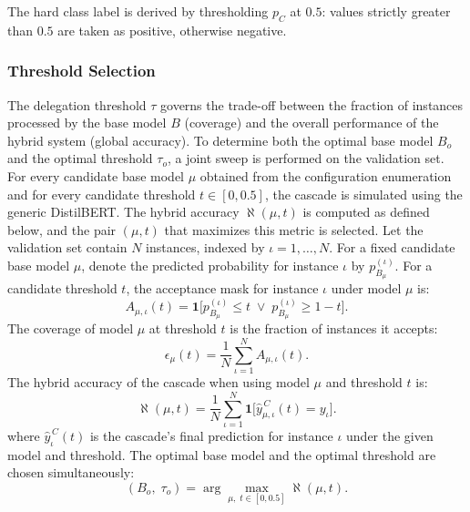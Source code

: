 \documentclass[a4paper,fleqn]{cas-dc}
\newcommand{\predVal}{y}
\newcommand{\idx}{\iota}
\newcommand{\mBase}{B}
\newcommand{\mCas}{C}
\newcommand{\thresh}{\tau}
\newcommand{\numVal}{N}
\newcommand{\modelvar}{\mu}
\newcommand{\sweepthresh}{t}
\newcommand{\probSmall}[1]{p_{#1}}
\newcommand{\accMask}[3]{A_{#1,#2}(#3)}
\newcommand{\coverage}[2]{\epsilon_{#1}(#2)}
\newcommand{\hybridacc}[2]{\aleph(#1,#2)}
\newcommand{\cascadePred}[3]{\hat{\predVal}_{#1,#2}^{\,\mCas}(#3)}
\newcommand{\baseProb}[2]{\probSmall{\mBase_{\!#1}}^{(#2)}}
\newcommand{\optimal}{o}
\begin{document}
The hard class label is derived by thresholding $\probSmall{\mCas}$ at $0.5$: values strictly greater than $0.5$ are taken as positive, otherwise negative.

\subsubsection{Threshold Selection} \label{sec:threshold_selection}

The delegation threshold $\thresh$ governs the trade-off between the fraction of instances processed by the base model $\mBase$ (coverage) and the overall performance of the hybrid system (global accuracy). To determine both the optimal base model $\mBase_{\!\optimal}$ and the optimal threshold $\thresh_{\!\optimal}$, a joint sweep is performed on the validation set. For every candidate base model $\modelvar$ obtained from the configuration enumeration and for every candidate threshold $\sweepthresh \in [0,0.5]$, the cascade is simulated using the generic DistilBERT. The hybrid accuracy $\hybridacc{\modelvar}{\sweepthresh}$ is computed as defined below, and the pair $(\modelvar,\sweepthresh)$ that maximizes this metric is selected. Let the validation set contain $\numVal$ instances, indexed by $\idx = 1,\dots,\numVal$. For a fixed candidate base model $\modelvar$, denote the predicted probability for instance $\idx$ by $\probSmall{\mBase_{\!\modelvar}}^{(\idx)}$. For a candidate threshold $\sweepthresh$, the acceptance mask for instance $\idx$ under model $\modelvar$ is:
\begin{equation}
	\accMask{\modelvar}{\idx}{\sweepthresh} = \mathbf{1}\bigl[ \baseProb{\modelvar}{\idx} \le \sweepthresh \;\lor\; \baseProb{\modelvar}{\idx} \ge 1-\sweepthresh \bigr].
\end{equation}
The coverage of model $\modelvar$ at threshold $\sweepthresh$ is the fraction of instances it accepts:
\begin{equation}	
	\coverage{\modelvar}{\sweepthresh} = \frac{1}{\numVal}\sum_{\idx=1}^{\numVal} A_{\modelvar,\idx}(\sweepthresh).
\end{equation}
The hybrid accuracy of the cascade when using model $\mu$ and threshold $\sweepthresh$ is:
\begin{equation}
	\hybridacc{\modelvar}{\sweepthresh} = \frac{1}{\numVal}\sum_{\idx=1}^{\numVal} \mathbf{1}\bigl[ \cascadePred{\modelvar}{\idx}{\sweepthresh} = \predVal_{\idx} \bigr].
\end{equation}
where $\hat{y}_{\iota}^{\,\mCas}(\sweepthresh)$ is the cascade's final prediction for instance $\iota$ under the given model and threshold. The optimal base model and the optimal threshold are chosen simultaneously:
\begin{equation}
	(\mBase_{\!\optimal},\;\thresh_{\!\optimal}) =
	\arg\max_{\mu,\;\sweepthresh \in [0,0.5]}
	\aleph(\mu,\sweepthresh).
\end{equation}
\end{document}
